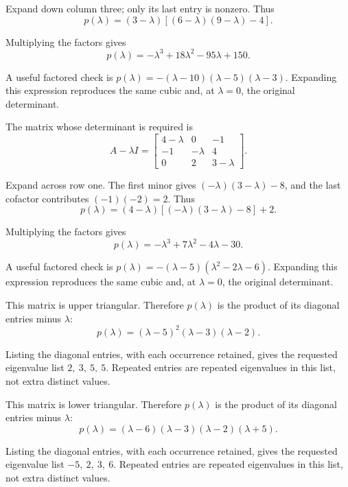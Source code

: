 Expand down column three; only its last entry is nonzero. Thus
\[ p(\lambda)=(3-\lambda)[(6-\lambda)(9-\lambda)-4].\]

Multiplying the factors gives
\[ \boxed{p(\lambda)=- \lambda^{3} + 18 \lambda^{2} - 95 \lambda + 150}.\]

A useful factored check is $p(\lambda)=- \left(\lambda - 10\right) \left(\lambda - 5\right) \left(\lambda - 3\right)$. Expanding this expression reproduces the same cubic and, at $\lambda=0$, the original determinant.

The matrix whose determinant is required is
\[ A-\lambda I=\begin{bmatrix}4 - \lambda & 0 & -1\\-1 & - \lambda & 4\\0 & 2 & 3 - \lambda\end{bmatrix}.\]

Expand across row one. The first minor gives $(-\lambda)(3-\lambda)-8$, and the last cofactor contributes $(-1)(-2)=2$. Thus
\[ p(\lambda)=(4-\lambda)[(-\lambda)(3-\lambda)-8]+2.\]

Multiplying the factors gives
\[ \boxed{p(\lambda)=- \lambda^{3} + 7 \lambda^{2} - 4 \lambda - 30}.\]

A useful factored check is $p(\lambda)=- \left(\lambda - 5\right) \left(\lambda^{2} - 2 \lambda - 6\right)$. Expanding this expression reproduces the same cubic and, at $\lambda=0$, the original determinant.

This matrix is upper triangular. Therefore $p(\lambda)$ is the product of its diagonal entries minus $\lambda$:
\[ p(\lambda)=\left(\lambda - 5\right)^{2} \left(\lambda - 3\right) \left(\lambda - 2\right).\]

Listing the diagonal entries, with each occurrence retained, gives the requested eigenvalue list $2,\ 3,\ 5,\ 5$. Repeated entries are repeated eigenvalues in this list, not extra distinct values.

This matrix is lower triangular. Therefore $p(\lambda)$ is the product of its diagonal entries minus $\lambda$:
\[ p(\lambda)=\left(\lambda - 6\right) \left(\lambda - 3\right) \left(\lambda - 2\right) \left(\lambda + 5\right).\]

Listing the diagonal entries, with each occurrence retained, gives the requested eigenvalue list $-5,\ 2,\ 3,\ 6$. Repeated entries are repeated eigenvalues in this list, not extra distinct values.

